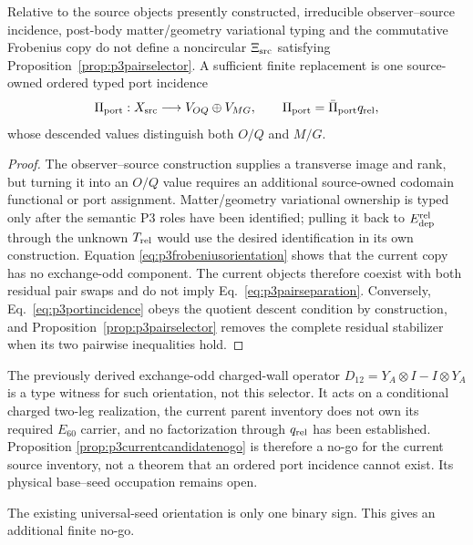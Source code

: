 \begin{proposition}
\label{prop:p3currentcandidatenogo}
Relative to the source objects presently constructed, irreducible
observer--source incidence, post-body matter/geometry variational typing and
the commutative Frobenius copy do not define a noncircular
$\Xi_{\rm src}$ satisfying Proposition~\ref{prop:p3pairselector}. A
sufficient finite replacement is one source-owned ordered typed port
incidence
\begin{equation}
 \Pi_{\rm port}:X_{\rm src}\longrightarrow V_{OQ}\oplus V_{MG},
 \qquad
 \Pi_{\rm port}=\bar\Pi_{\rm port}q_{\rm rel},
 \label{eq:p3portincidence}
\end{equation}
whose descended values distinguish both $O/Q$ and $M/G$.
\end{proposition}

\begin{proof}
The observer--source construction supplies a transverse image and rank, but
turning it into an $O/Q$ value requires an additional source-owned codomain
functional or port assignment. Matter/geometry variational ownership is
typed only after the semantic P3 roles have been identified; pulling it back
to $E_{\rm dep}^{\rm rel}$ through the unknown $T_{\rm rel}$ would use the
desired identification in its own construction. Equation
\eqref{eq:p3frobeniusorientation} shows that the current copy has no
exchange-odd component. The current objects therefore coexist with both
residual pair swaps and do not imply Eq.~\eqref{eq:p3pairseparation}.
Conversely, Eq.~\eqref{eq:p3portincidence} obeys the quotient descent
condition by construction, and Proposition~\ref{prop:p3pairselector} removes
the complete residual stabilizer when its two pairwise inequalities hold.
\end{proof}

The previously derived exchange-odd charged-wall operator
$D_{12}=Y_A\otimes I-I\otimes Y_A$ is a type witness for such orientation,
not this selector. It acts on a conditional charged two-leg realization, the
current parent inventory does not own its required $E_{60}$ carrier, and no
factorization through $q_{\rm rel}$ has been established. Proposition
\ref{prop:p3currentcandidatenogo} is therefore a no-go for the current source
inventory, not a theorem that an ordered port incidence cannot exist. Its
physical base--seed occupation remains open.

The existing universal-seed orientation is only one binary sign. This gives
an additional finite no-go.

